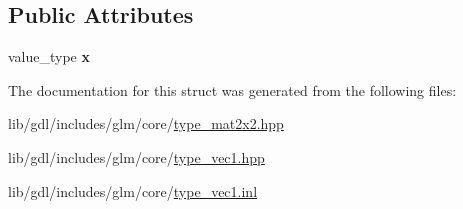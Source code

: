 \subsection*{Public Attributes}
\begin{DoxyCompactItemize}
\item 
\hypertarget{structglm_1_1detail_1_1tvec1_a0c881ef566673e7fb8e6e6703695a461}{}value\+\_\+type {\bfseries x}\label{structglm_1_1detail_1_1tvec1_a0c881ef566673e7fb8e6e6703695a461}

\end{DoxyCompactItemize}


The documentation for this struct was generated from the following files\+:\begin{DoxyCompactItemize}
\item 
lib/gdl/includes/glm/core/\hyperlink{type__mat2x2_8hpp}{type\+\_\+mat2x2.\+hpp}\item 
lib/gdl/includes/glm/core/\hyperlink{type__vec1_8hpp}{type\+\_\+vec1.\+hpp}\item 
lib/gdl/includes/glm/core/\hyperlink{type__vec1_8inl}{type\+\_\+vec1.\+inl}\end{DoxyCompactItemize}
